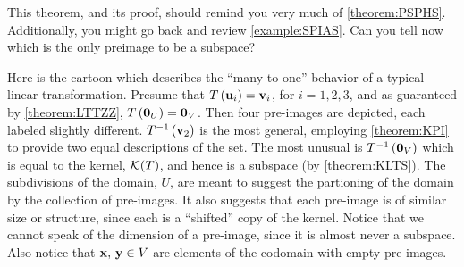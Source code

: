 \documentclass{ximera}
\begin{document}
This theorem, and its proof, should remind you very much of \ref{theorem:PSPHS}.  Additionally, you might go back and review \ref{example:SPIAS}.  Can you tell now which is the only preimage to be a subspace?



Here is the cartoon which describes the ``many-to-one'' behavior of a typical linear transformation.  Presume that $T\left(\mathbf{u}_i\right)=\mathbf{v}_i$, for $i=1,2,3$, and as guaranteed by \ref{theorem:LTTZZ}, $T\left(\mathbf{0}_U\right)=\mathbf{0}_V$.  Then four pre-images are depicted, each labeled slightly different.  $T^{-1}\left(\mathbf{v}_2\right)$ is the most general, employing \ref{theorem:KPI} to provide two equal descriptions of the set.  The most unusual is $T^{-1}\left(\mathbf{0}_V\right)$ which is equal to the kernel, $\mathcal{K}\!\left(T\right)$, and hence is a subspace (by \ref{theorem:KLTS}).  The subdivisions of the domain, $U$, are meant to suggest the partioning of the domain by the collection of pre-images.  It also suggests that each pre-image is of similar size or structure, since each is a ``shifted'' copy of the kernel.  Notice that we cannot speak of the dimension of a pre-image, since it is almost never a subspace.  Also notice that $\mathbf{x},\,\mathbf{y}\in V$ are elements of the codomain with empty pre-images.
\end{document}
